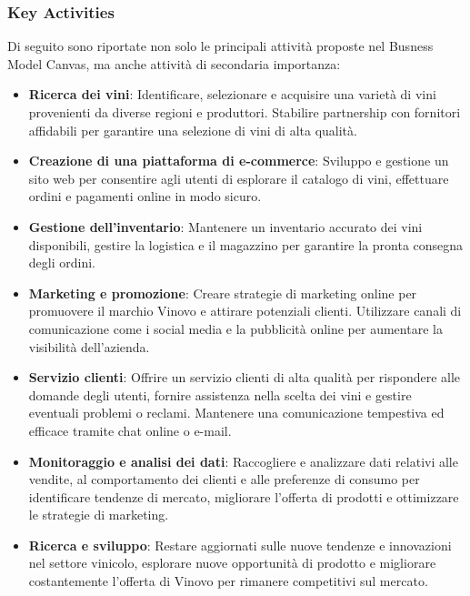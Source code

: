 \documentclass[12pt, a4paper]{article}
\begin{document}
\subsubsection{Key Activities}
Di seguito sono riportate non solo le principali attività proposte nel Busness Model Canvas, ma anche attività di secondaria importanza:
\begin{itemize}
    \item \textbf{Ricerca dei vini}: Identificare, selezionare e acquisire una varietà di vini provenienti da diverse regioni e produttori. Stabilire partnership con fornitori affidabili per garantire una selezione di vini di alta qualità.
    \item \textbf{Creazione di una piattaforma di e-commerce}: Sviluppo e gestione un sito web per consentire agli utenti di esplorare il catalogo di vini, effettuare ordini e pagamenti online in modo sicuro.
    \item \textbf{Gestione dell'inventario}: Mantenere un inventario accurato dei vini disponibili, gestire la logistica e il magazzino per garantire la pronta consegna degli ordini.
    \item \textbf{Marketing e promozione}: Creare strategie di marketing online per promuovere il marchio Vinovo e attirare potenziali clienti. Utilizzare canali di comunicazione come i social media e la pubblicità online per aumentare la visibilità dell'azienda.
    \item \textbf{Servizio clienti}: Offrire un servizio clienti di alta qualità per rispondere alle domande degli utenti, fornire assistenza nella scelta dei vini e gestire eventuali problemi o reclami. Mantenere una comunicazione tempestiva ed efficace tramite chat online o e-mail.
    \item \textbf{Monitoraggio e analisi dei dati}: Raccogliere e analizzare dati relativi alle vendite, al comportamento dei clienti e alle preferenze di consumo per identificare tendenze di mercato, migliorare l'offerta di prodotti e ottimizzare le strategie di marketing.
    \item \textbf{Ricerca e sviluppo}: Restare aggiornati sulle nuove tendenze e innovazioni nel settore vinicolo, esplorare nuove opportunità di prodotto e migliorare costantemente l'offerta di Vinovo per rimanere competitivi sul mercato.
\end{itemize}
\end{document}
